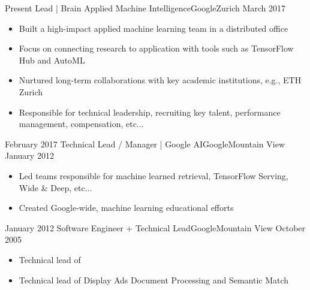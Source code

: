 \begin{experiences}
	
  \emptySeparator
 
  \experience
    {Present}   {Lead | Brain Applied Machine Intelligence}{Google}{Zurich}
    {March 2017} {
                      \begin{itemize}
                        \item Built a high-impact applied machine learning team in a distributed office
                        \item Focus on connecting research to application with tools such as TensorFlow Hub and AutoML
                        \item Nurtured long-term collaborations with key academic institutions, e.g., ETH Zurich
                        \item Responsible for technical leadership, recruiting key talent, performance management, compensation, etc...
                      \end{itemize}
                    }
                    {}

  \experience
    {February 2017}   {Technical Lead / Manager | Google AI}{Google}{Mountain View}
    {January 2012} {
                      \begin{itemize}
                        \item Led teams responsible for machine learned retrieval, TensorFlow Serving, Wide \& Deep, etc...
                        \item Created Google-wide, machine learning educational efforts
                      \end{itemize}
                    }
                    {}
  \experience
    {January 2012}   {Software Engineer + Technical Lead}{Google}{Mountain View}
    {October 2005} {
                      \begin{itemize}
                        \item Technical lead of 
                        \item Technical lead of Display Ads Document Processing and Semantic Match
                      \end{itemize}
                    }
                    {}
\end{experiences}

